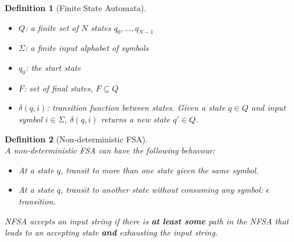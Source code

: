 \documentclass[12pt]{article}
\newtheorem{definition}{Definition}[section]
\theoremstyle{definition}
\begin{document}
\begin{definition}[Finite State Automata]
\hfill\\\normalfont 
\begin{itemize}
	\item $Q$: a finite set of $N$ states $q_0,\ldots, q_{N-1}$
	\item $\Sigma$: a finite input alphabet of symbols
	\item $q_0$: the start state
	\item $F$: set of final states, $F\subseteq Q$
	\item $\delta(q,i)$: transition function between states. Given a state $q\in Q$ and input symbol $i\in \Sigma$, $\delta(q,i)$ returns a new state $q'\in Q$.
\end{itemize}
\end{definition}
\begin{definition}[Non-deterministic FSA]
\hfill\\\normalfont A non-deterministic FSA can have the following behavour:
\begin{itemize}
	\item At a state $q$, transit to more than one state given the same symbol.
	\item At a state $q$, transit to another state without consuming any symbol: $\epsilon$ transition.
\end{itemize}
NFSA accepts an input string if there is \textbf{at least some} path in the NFSA that leads to an accepting state \textbf{and} exhausting the input string.
\end{definition}
\clearpage
\end{document}
